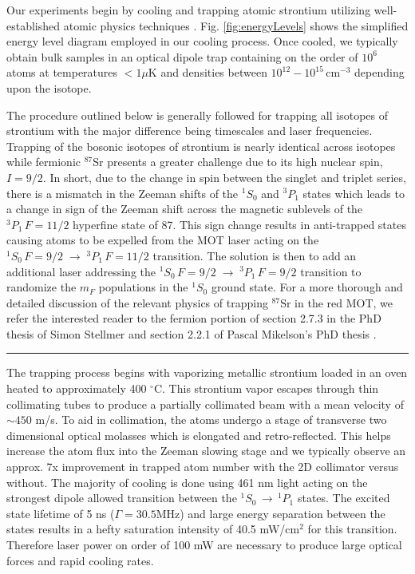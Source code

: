 Our experiments begin by cooling and trapping atomic strontium utilizing well-established atomic physics techniques \cite{Metcalf1999,Katori1999,Ido2000,Nagel2003,Mukaiyama2003a,Loftus2004,mmy09a,sth09a,Mickelson2010ja,Tey2010a,dym10a,stg10}. 
Fig. \;\ref{fig:energyLevels} shows the simplified energy level diagram employed in our cooling process. 
Once cooled, we typically obtain bulk samples in an optical dipole trap containing on the order of $10^6$ atoms at temperatures $<1\mu$K and densities between $10^{12} - 10^{15}\,$cm$^{-3}$ depending upon the isotope. 

The procedure outlined below is generally followed for trapping all isotopes of strontium with the major difference being timescales and laser frequencies.
Trapping of the bosonic isotopes of strontium is nearly identical across isotopes while fermionic $^{87}$Sr presents a greater challenge due to its high nuclear spin, $I=9/2$.
In short, due to the change in spin between the singlet and triplet series, there is a mismatch in the Zeeman shifts of the $^1S_0$ and $^3P_1$ states which leads to a change in sign of the Zeeman shift across the magnetic sublevels of the $^3P_1\,F=11/2$ hyperfine state of 87.
This sign change results in anti-trapped states causing atoms to be expelled from the MOT laser acting on the $^1S_0\,F=9/2\;\rightarrow\;^3P_1\,F=11/2$ transition.
The solution is then to add an additional laser addressing the $^1S_0\,F=9/2\;\rightarrow\;^3P_1\,F=9/2$ transition to randomize the $m_F$ populations in the $^1S_0$ ground state.
For a more thorough and detailed discussion of the relevant physics of trapping $^{87}$Sr in the red MOT, we refer the interested reader to the fermion portion of section 2.7.3 in the PhD thesis of Simon Stellmer \cite{SimonStellmer2013} and section 2.2.1 of Pascal Mikelson's PhD thesis \cite{Mickelson2010b}.

\noindent \rule{75pt}{0.5pt} \newline
The trapping process begins with vaporizing metallic strontium loaded in an oven heated to approximately 400 $^{\circ}$C. 
This strontium vapor escapes through thin collimating tubes to produce a partially collimated beam with a mean velocity of $\sim450$ m/s.
To aid in collimation, the atoms undergo a stage of transverse two dimensional optical molasses which is elongated and retro-reflected.
This helps increase the atom flux into the Zeeman slowing stage and we typically observe an approx. 7x improvement in trapped atom number with the 2D collimator versus without.
The majority of cooling is done using 461 nm light acting on the strongest dipole allowed transition between the $^1S_0\,\rightarrow\,^1P_1$ states.
The excited state lifetime of 5 ns ($\Gamma=30.5$MHz) and large energy separation between the states results in a hefty saturation intensity of 40.5 mW/cm$^2$ for this transition.
Therefore laser power on order of 100 mW are necessary to produce large optical forces and rapid cooling rates.

